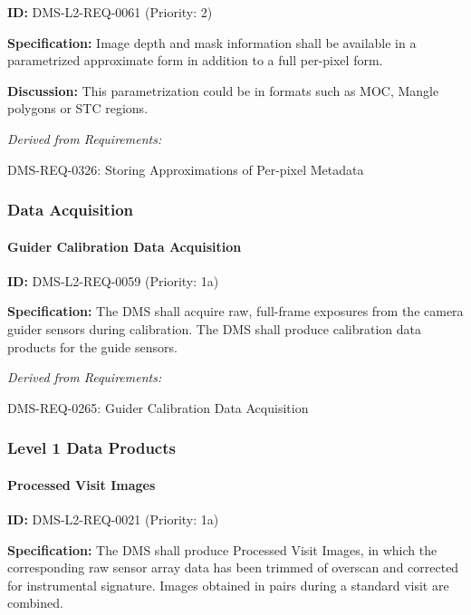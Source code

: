 \documentclass[SE,toc,lsstdraft]{lsstdoc}
\begin{document}
\label{DMS-L2-REQ-0061}
\textbf{ID:} DMS-L2-REQ-0061 (Priority: 2)

\textbf{Specification:} Image depth and mask information shall be available in a parametrized approximate form in addition to a full per-pixel form.

\textbf{Discussion:} This parametrization could be in formats such as MOC, Mangle polygons or STC regions.

\emph{Derived from Requirements:}

DMS-REQ-0326:
Storing Approximations of Per-pixel Metadata \newline

\subsubsection{Data Acquisition}

\paragraph{Guider Calibration Data Acquisition}\hfill  %

\label{DMS-L2-REQ-0059}
\textbf{ID:} DMS-L2-REQ-0059 (Priority: 1a)

\textbf{Specification:} The DMS shall acquire raw, full-frame exposures from the camera guider sensors during calibration. The DMS shall produce calibration data products for the guide sensors.

\emph{Derived from Requirements:}

DMS-REQ-0265:
Guider Calibration Data Acquisition \newline

\subsubsection{Level 1 Data Products}

\paragraph{Processed Visit Images}\hfill  %

\label{DMS-L2-REQ-0021}
\textbf{ID:} DMS-L2-REQ-0021 (Priority: 1a)

\textbf{Specification: }The DMS shall produce Processed Visit Images, in which the corresponding raw sensor array data has been trimmed of overscan and corrected for instrumental signature. Images obtained in pairs during a standard visit are combined.
\end{document}

